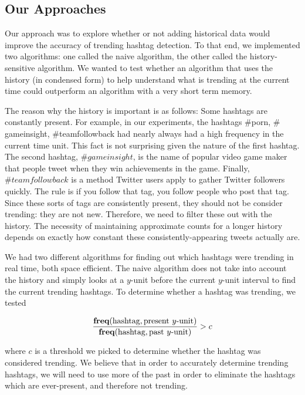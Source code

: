 \documentclass[twoside]{article}
\begin{document}
{\subsection{Our Approaches}

Our approach was to explore whether or not adding historical data would improve the accuracy of 
trending hashtag detection. To that end, we implemented two algorithms: one called the naive algorithm, the other called the history-sensitive algorithm. We wanted to test whether an algorithm that uses
the history (in condensed form) to help understand what is trending at the current time could outperform an algorithm with a very short term memory. 

The reason why the history is important is as follows: Some hashtags are constantly present. For example, in our experiments, the hashtags $\#$porn, $\#$gameinsight, $\#$teamfollowback had nearly always had a high frequency in the current time unit. This fact is not surprising given the nature of the first hashtag. The second hashtag, $\#gameinsight$, is the name of popular video game maker that people tweet when they win achievements in the game. Finally, $\#teamfollowback$ is a method Twitter users apply to gather Twitter followers quickly. The rule is if you follow that tag, you follow people who post that tag. Since these sorts of tags are consistently present, they should not be consider trending: they are not new. Therefore, we need to filter these out with the history.
The necessity of maintaining approximate counts for a longer history depends on exactly how constant these consistently-appearing tweets actually are. 

We had two different algorithms for finding out which hashtags were trending in real time, both space efficient.
The naive algorithm does not take into account the history and simply looks at a $y$-unit before the current $y$-unit interval to find the current trending hashtags. To determine whether a hashtag was trending, we tested

\begin{equation}
\label{eq:threshold}
\frac{\textbf{freq}(\textnormal{hashtag}, \textnormal{present } y \textnormal{-unit})}{\textbf{freq}(\textnormal{hashtag}, \textnormal{past } y \textnormal{-unit})} > c
\end{equation}

where $c$ is a threshold we picked to determine whether the hashtag was considered trending. We believe that in order to accurately determine trending hashtags, we will need to use more of the past in order to eliminate the hashtags which are ever-present, and therefore not trending. 


}
\end{document}
